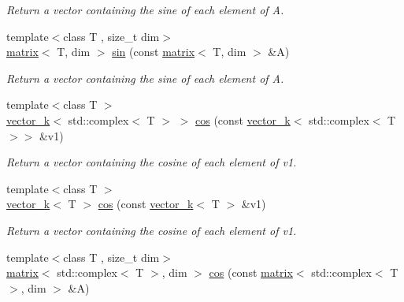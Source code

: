 \begin{DoxyCompactItemize}
\begin{DoxyCompactList}\small\item\em Return a vector containing the sine of each element of A. \end{DoxyCompactList}\item 
\hypertarget{namespacekeycpp_aedb234b850e34f9331031d39084fdbb0}{{\footnotesize template$<$class T , size\-\_\-t dim$>$ }\\\hyperlink{classkeycpp_1_1matrix}{matrix}$<$ T, dim $>$ \hyperlink{namespacekeycpp_aedb234b850e34f9331031d39084fdbb0}{sin} (const \hyperlink{classkeycpp_1_1matrix}{matrix}$<$ T, dim $>$ \&A)}\label{namespacekeycpp_aedb234b850e34f9331031d39084fdbb0}

\begin{DoxyCompactList}\small\item\em Return a vector containing the sine of each element of A. \end{DoxyCompactList}\item 
\hypertarget{namespacekeycpp_a917607e20e487553be913b7ccaa4736d}{{\footnotesize template$<$class T $>$ }\\\hyperlink{classkeycpp_1_1vector__k}{vector\-\_\-k}$<$ std\-::complex$<$ T $>$ $>$ \hyperlink{namespacekeycpp_a917607e20e487553be913b7ccaa4736d}{cos} (const \hyperlink{classkeycpp_1_1vector__k}{vector\-\_\-k}$<$ std\-::complex$<$ T $>$$>$ \&v1)}\label{namespacekeycpp_a917607e20e487553be913b7ccaa4736d}

\begin{DoxyCompactList}\small\item\em Return a vector containing the cosine of each element of v1. \end{DoxyCompactList}\item 
\hypertarget{namespacekeycpp_a1d9cd34e13780fffeb1de19287f5636d}{{\footnotesize template$<$class T $>$ }\\\hyperlink{classkeycpp_1_1vector__k}{vector\-\_\-k}$<$ T $>$ \hyperlink{namespacekeycpp_a1d9cd34e13780fffeb1de19287f5636d}{cos} (const \hyperlink{classkeycpp_1_1vector__k}{vector\-\_\-k}$<$ T $>$ \&v1)}\label{namespacekeycpp_a1d9cd34e13780fffeb1de19287f5636d}

\begin{DoxyCompactList}\small\item\em Return a vector containing the cosine of each element of v1. \end{DoxyCompactList}\item 
\hypertarget{namespacekeycpp_a918a1ad9493c25e0afb4d2a37af24d25}{{\footnotesize template$<$class T , size\-\_\-t dim$>$ }\\\hyperlink{classkeycpp_1_1matrix}{matrix}$<$ std\-::complex$<$ T $>$, dim $>$ \hyperlink{namespacekeycpp_a918a1ad9493c25e0afb4d2a37af24d25}{cos} (const \hyperlink{classkeycpp_1_1matrix}{matrix}$<$ std\-::complex$<$ T $>$, dim $>$ \&A)}\label{namespacekeycpp_a918a1ad9493c25e0afb4d2a37af24d25}


\end{DoxyCompactItemize}
